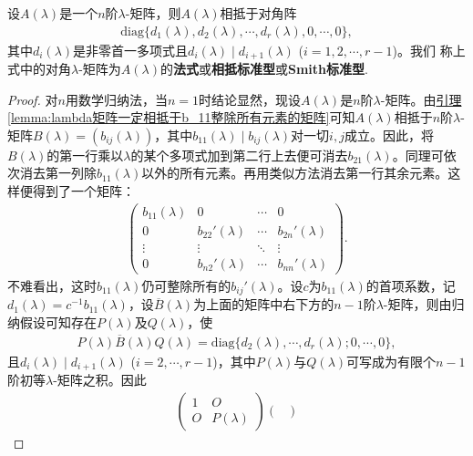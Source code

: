 \documentclass[../../main.tex]{subfiles}%
\begin{document}
\begin{theorem}\label{theorem:lambda矩阵相抵于特殊的对角阵}
设$A(\lambda)$是一个$n$阶$\lambda$-矩阵，则$A(\lambda)$相抵于对角阵
\begin{align}
\mathrm{diag}\{d_1(\lambda),d_2(\lambda),\cdots,d_r(\lambda),0,\cdots,0\},\label{theorem0.1-7.1.1}
\end{align}
其中$d_i(\lambda)$是非零首一多项式且$d_i(\lambda)\mid d_{i + 1}(\lambda)$ ($i = 1,2,\cdots,r - 1$)。我们
称上式中的对角$\lambda$-矩阵为$A(\lambda)$的\textbf{法式}或\textbf{相抵标准型}或\textbf{Smith标准型}. 
\end{theorem}
\begin{proof}

对$n$用数学归纳法，当$n = 1$时结论显然，现设$A(\lambda)$是$n$阶$\lambda$-矩阵。由\hyperref[lemma:lambda矩阵一定相抵于b_11整除所有元素的矩阵]{引理\ref{lemma:lambda矩阵一定相抵于b_11整除所有元素的矩阵}}可知$A(\lambda)$相抵于$n$阶$\lambda$-矩阵$B(\lambda)=(b_{ij}(\lambda))$，其中$b_{11}(\lambda)\mid b_{ij}(\lambda)$对一切$i,j$成立。因此，将$B(\lambda)$的第一行乘以$\lambda$的某个多项式加到第二行上去便可消去$b_{21}(\lambda)$。同理可依次消去第一列除$b_{11}(\lambda)$以外的所有元素。再用类似方法消去第一行其余元素。这样便得到了一个矩阵：
\begin{align*}
\begin{pmatrix}
b_{11}(\lambda)&0&\cdots&0\\
0&b_{22}'(\lambda)&\cdots&b_{2n}'(\lambda)\\
\vdots&\vdots&\ddots&\vdots\\
0&b_{n2}'(\lambda)&\cdots&b_{nn}'(\lambda)
\end{pmatrix}.
\end{align*}
不难看出，这时$b_{11}(\lambda)$仍可整除所有的$b_{ij}'(\lambda)$。设$c$为$b_{11}(\lambda)$的首项系数，记$d_1(\lambda)=c^{-1}b_{11}(\lambda)$，设$\overline{B}(\lambda)$为上面的矩阵中右下方的$n - 1$阶$\lambda$-矩阵，则由归纳假设可知存在$P(\lambda)$及$Q(\lambda)$，使
\begin{align*}
P(\lambda)\overline{B}(\lambda)Q(\lambda)=\mathrm{diag}\{d_2(\lambda),\cdots,d_r(\lambda);0,\cdots,0\},
\end{align*}
且$d_i(\lambda)\mid d_{i + 1}(\lambda)$ ($i = 2,\cdots,r - 1$)，其中$P(\lambda)$与$Q(\lambda)$可写成为有限个$n - 1$阶初等$\lambda$-矩阵之积。因此
\begin{align*}
\begin{pmatrix}
1&O\\
O&P(\lambda)
\end{pmatrix}
\begin{pmatrix}

\end{pmatrix}
\end{align*}
\end{proof}
\end{document}
